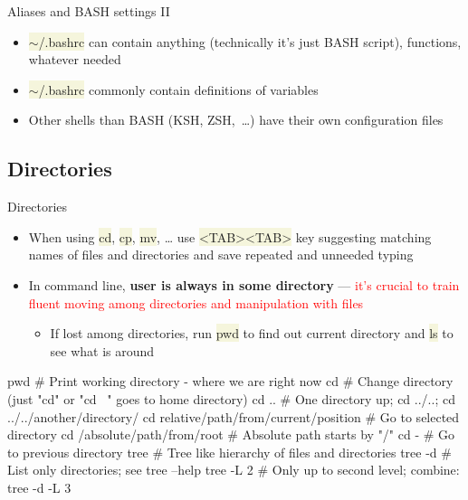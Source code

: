 \documentclass[compress, xelatex, 11pt, xcolor=svgnames, aspectratio=169, url={hyphens, lowtilde}]{beamer}
\renewcommand{\texttt}[1]{\colorbox{Beige}{{\ttfamily #1}}}
\renewcommand{\alert}[1]{\textcolor{red}{#1}}
\begin{document}
\begin{frame}[fragile]{Aliases and BASH settings II}
	\begin{itemize}
		\item \texttt{$\sim$/.bashrc} can contain anything (technically it's just BASH script), functions, whatever needed
		\item \texttt{$\sim$/.bashrc} commonly contain definitions of variables
		\item Other shells than BASH (KSH, ZSH,~\ldots) have their own configuration files
	\end{itemize}
\end{frame}

\subsection{Directories}

\begin{frame}[fragile]{Directories}
	\begin{itemize}
		\item When using \texttt{cd}, \texttt{cp}, \texttt{mv}, \ldots{ }use \texttt{<TAB><TAB>} key suggesting matching names of files and directories and save repeated and unneeded typing
		\item In command line, \textbf{user is always in some directory} --- \alert{it's crucial to train fluent moving among directories and manipulation with files}
		\begin{itemize}
			\item If lost among directories, run \texttt{pwd} to find out current directory and \texttt{ls} to see what is around
		\end{itemize}
	\end{itemize}
	\begin{bashcode}
    pwd # Print working directory - where we are right now
    cd # Change directory (just "cd" or "cd ~" goes to home directory)
    cd .. # One directory up; cd ../..; cd ../../another/directory/
    cd relative/path/from/current/position # Go to selected directory
    cd /absolute/path/from/root # Absolute path starts by "/"
    cd - # Go to previous directory
    tree # Tree like hierarchy of files and directories
    tree -d # List only directories; see tree --help
    tree -L 2 # Only up to second level; combine: tree -d -L 3
	\end{bashcode}
\end{frame}
\end{document}
